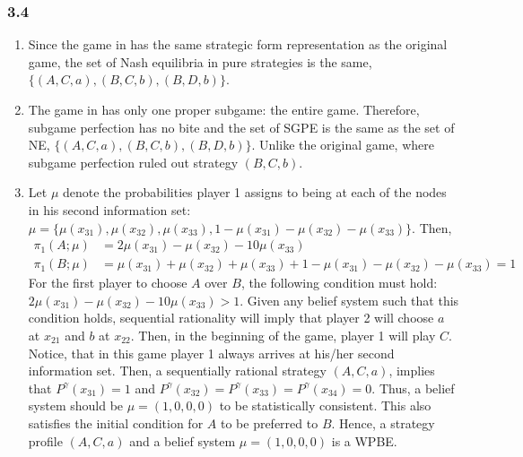 \documentclass[]{article}
\begin{document}
\subsubsection*{3.4}

\begin{enumerate}[label=(\roman*)]
	\item Since the game in  has the same strategic form representation as the original game, the set of Nash equilibria in pure strategies is the  same, $\{(A, C, a), (B, C, b), (B, D, b)\}$.
	
	\item The game in  has only one proper subgame: the entire game. Therefore, subgame perfection has no bite and the set of SGPE is the same as the set of NE, $\{(A, C, a), (B, C, b), (B, D, b)\}$. Unlike the original game, where subgame perfection ruled out strategy $(B, C, b)$.
	
	\item Let $\mu$ denote the probabilities player 1 assigns to being at each of the nodes in his second information set: $\mu = \{\mu(x_{31}), \mu(x_{32}), \mu(x_{33}), 1 - \mu(x_{31}) - \mu(x_{32}) - \mu(x_{33})\}$. Then,
	\begin{equation}
		\begin{split}
			\pi_1(A; \mu)& = 2\mu(x_{31}) - \mu(x_{32}) - 10\mu(x_{33}) \\ \nonumber
			\pi_1(B; \mu)& = \mu(x_{31}) + \mu(x_{32}) + \mu(x_{33}) + 1 - \mu(x_{31}) - \mu(x_{32}) - \mu(x_{33}) = 1
		\end{split}
	\end{equation}
	For the first player to choose $A$ over $B$, the following condition must hold: $2\mu(x_{31}) - \mu(x_{32}) - 10\mu(x_{33}) > 1$. Given any belief system such that this condition holds, sequential rationality will imply that player 2 will choose $a$ at $x_{21}$ and $b$ at $x_{22}$. Then, in the beginning of the game, player 1 will play $C$. Notice, that in this game player 1 always arrives at his/her second information set. Then, a sequentially rational strategy $(A, C, a)$, implies that $P^\gamma(x_{31}) = 1$ and $P^\gamma(x_{32}) = P^\gamma(x_{33}) = P^\gamma(x_{34}) = 0$. Thus, a belief system should be $\mu = (1, 0, 0, 0)$ to be statistically consistent. This also satisfies the initial condition for $A$ to be preferred to $B$. Hence, a strategy profile $(A, C, a)$ and a belief system $\mu = (1, 0, 0, 0)$ is a WPBE.
	

\end{enumerate}
\end{document}
